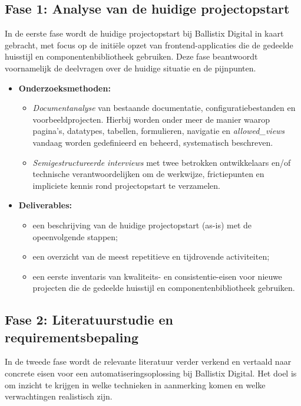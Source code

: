 \subsection*{Fase 1: Analyse van de huidige projectopstart}
In de eerste fase wordt de huidige projectopstart bij Ballistix Digital in kaart gebracht, met focus op de initiële opzet van frontend-applicaties die de gedeelde huisstijl en componentenbibliotheek gebruiken. Deze fase beantwoordt voornamelijk de deelvragen over de huidige situatie en de pijnpunten.

\begin{itemize}
  \item \textbf{Onderzoeksmethoden:}
        \begin{itemize}
          \item \emph{Documentanalyse} van bestaande documentatie, configuratiebestanden en voorbeeldprojecten. Hierbij worden onder meer de manier waarop pagina's, datatypes, tabellen, formulieren, navigatie en \emph{allowed\_views} vandaag worden gedefinieerd en beheerd, systematisch beschreven.
          \item \emph{Semigestructureerde interviews} met twee betrokken ontwikkelaars en/of technische verantwoordelijken om de werkwijze, frictiepunten en impliciete kennis rond projectopstart te verzamelen.
        \end{itemize}
  \item \textbf{Deliverables:}
        \begin{itemize}
          \item een beschrijving van de huidige projectopstart (as-is) met de opeenvolgende stappen;
          \item een overzicht van de meest repetitieve en tijdrovende activiteiten;
          \item een eerste inventaris van kwaliteits- en consistentie-eisen voor nieuwe projecten die de gedeelde huisstijl en componentenbibliotheek gebruiken.
        \end{itemize}
\end{itemize}

\subsection*{Fase 2: Literatuurstudie en requirementsbepaling}
In de tweede fase wordt de relevante literatuur verder verkend en vertaald naar concrete eisen voor een automatiseringsoplossing bij Ballistix Digital. Het doel is om inzicht te krijgen in welke technieken in aanmerking komen en welke verwachtingen realistisch zijn.

